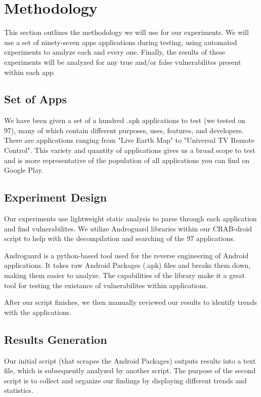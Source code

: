\section{Methodology}
\label{sec:overview} 

This section outlines the methodology we will use for our experiments.
We will use a set of ninety-seven apps applications during testing, using
automated experiments to analyze each and every one. Finally, the results
of these experiments will be analyzed for any true and/or false vulnerabilites
present within each app.

\subsection{Set of Apps}

We have been given a set of a hundred .apk applications to test (we tested on 97), many of 
which contain different purposes, uses, features, and developers. There are 
applications ranging from "Live Earth Map" to "Universal TV Remote Control".
This variety and quantity of applications gives us a broad scope to test and is 
more representative of the population of all applications you can find on 
Google Play.

\subsection{Experiment Design}

Our experiments use lightweight static analysis to parse through each
application and find vulnerabilites. We utilize Androguard libraries within our
CRAB-droid script to help with the decompilation and searching of the 97 applications.

Androguard is a python-based tool used for the reverse engineering of
Android applications. It takes raw Android Packages (.apk) files and breaks
them down, making them easier to analyze. The capabilities of the library make it
a great tool for testing the existance of vulnerabilites within applications.

After our script finishes, we then manually reviewed our results to identify
trends with the applications.


\subsection{Results Generation}

Our initial script (that scrapes the Android Packages) outputs results into a text file, 
which is subsequently analyzed by another script. The purpose of the second script is to
collect and organize our findings by displaying different trends and statistics.


